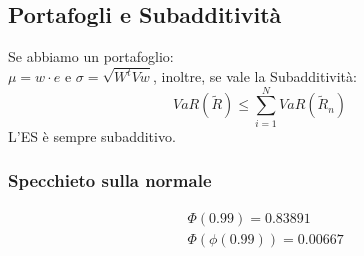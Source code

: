 \documentclass[a4paper,notitlepage]{report}%
\begin{document}
\begin{multicols*}{2}
    \subsection*{Portafogli e Subadditività}
    Se abbiamo un portafoglio:\\
    $\mu = w\cdot e$ e $\sigma = \sqrt{W^tVw}$, inoltre, se vale
    la Subadditività:
    \[
        VaR(\tilde{R}) \leq \sum_{i=1}^N VaR(\tilde{R}_n)  
    \]
    L'ES è sempre subadditivo.

    \subsubsection*{Specchieto sulla normale}
    \begin{align*}
        & \Phi(0.99) = 0.83891\\
        & \Phi(\phi(0.99)) = 0.00667
    \end{align*}

    
\end{multicols*}
\end{document}
